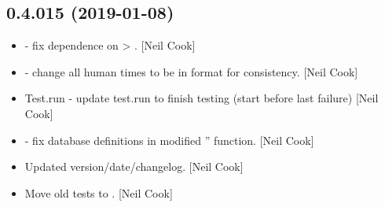 \documentclass[a4paper,10pt,english]{report}
\begin{document}
\subsection{0.4.015 (2019-01-08)}
\label{\detokenize{misc/changelog:id221}}\begin{itemize}
\item {} 
 - fix dependence on  \textendash{}\textgreater{} .
{[}Neil Cook{]}

\item {} 
 - change all human times to be in format
 for consistency. {[}Neil Cook{]}

\item {} 
Test.run - update test.run to finish testing (start before last
failure) {[}Neil Cook{]}

\item {} 
 - fix database definitions in modified ”
function. {[}Neil Cook{]}

\item {} 
Updated version/date/changelog. {[}Neil Cook{]}

\item {} 
Move old tests to . {[}Neil Cook{]}

\end{itemize}
\end{document}
